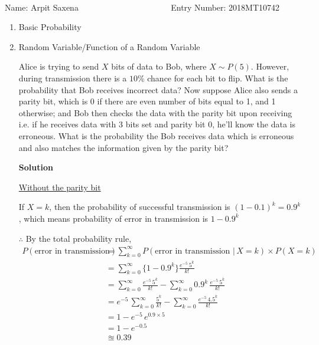 \documentclass[12pt, oneside]{article}
\begin{document}
\setlength{\textheight}{8.5in}
\\





\vskip 0.5cm

\noindent Name: Arpit Saxena ~~~~~~~~~~~~~~~~~~~~~ Entry Number: 2018MT10742



\vskip 0.5cm



\begin{enumerate}
	



\item {
    Basic Probability
}


\item {
    Random Variable/Function of a Random Variable

    Alice is trying to send \(X\) bits of data to Bob, where \(X \sim P(5)\). However, during
    transmission there is a \(10\%\) chance for each bit to flip. What is the probability
    that Bob receives incorrect data? Now suppose Alice also sends a parity bit, which is
    0 if there are even number of bits equal to 1, and 1 otherwise; and Bob then checks the
    data with the parity bit upon receiving i.e. if he receives data with 3 bits set and
    parity bit 0, he'll know the data is erroneous. What is the probability the Bob receives
    data which is erroneous and also matches the information given by the parity bit?

    \textbf{Solution}

    \underline{Without the parity bit}

    If \(X = k\), then the probability of successful transmission is \((1 - 0.1)^k = 0.9 ^ k\),
    which means probability of error in transmission is \(1 - 0.9^k\)

    \(\therefore\) By the total probability rule,
    \begin{align*}
        P(\text{error in transmission}) &= \sum_{k = 0}^{\infty} 
                        P(\text{error in transmission } |\,X = k) \times P(X = k) \\
            &= \sum_{k = 0}^{\infty} \{1 - 0.9^k\} \frac{e^{-5}\,5^k}{k!} \\
            &= \sum_{k = 0}^{\infty} \frac{e^{-5}\,5^k}{k!} - \sum_{k = 0}^{\infty} 0.9^k\,\frac{e^{-5}\,5^k}{k!} \\
            &= e^{-5}\,\sum_{k = 0}^{\infty} \frac{5^k}{k!} - \sum_{k = 0}^{\infty} \frac{e^{-5}\,4.5^k}{k!} \\
            &= 1 - e^{-5}\,e^{0.9 \times 5}  \tag*{(Using Taylor series of \(e^x\))} \\
            &= 1 - e^{-0.5} \\
            &\approxeq 0.39
    \end{align*}

}
\end{enumerate}
\end{document}
